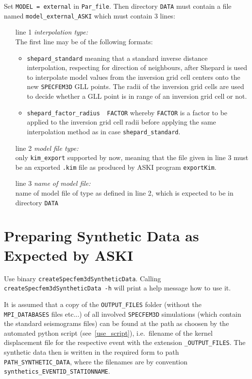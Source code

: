 \documentclass[12pt,a4paper]{article}
\newcommand{\lcode}[1]{\nolinkurl{#1}}
\newcommand{\ASKI}{ {\ttfamily ASKI} }
\begin{document}
Set \lcode{MODEL = external} in \lcode{Par_file}. Then directory \lcode{DATA} must contain a file
named \lcode{model_external_ASKI} which must contain 3 lines:
\begin{itemize}
\item[line 1] \emph{interpolation type:}\\
  The first line may be of the following formats:
  \begin{itemize}
  \item \lcode{shepard_standard}
    meaning that a standard inverse distance interpolation, respecting for direction of neighbours, after Shepard
    is used to interpolate model values from the inversion grid cell centers onto the new \lcode{SPECFEM3D} GLL points.
    The radii of the inversion grid cells are used to decide whether a GLL point is in range of an inversion grid cell
    or not.
  \item \lcode{shepard_factor_radius  FACTOR}
    whereby \lcode{FACTOR} is a factor to be applied to the inversion grid cell radii before applying the same
    interpolation method as in case \lcode{shepard_standard}.
  \end{itemize}
\item[line 2] \emph{model file type:}\\
  only \lcode{kim_export} supported by now, meaning that the file given in line 3 must be an exported \lcode{.kim} file
  as produced by \ASKI program \lcode{exportKim}.
\item[line 3] \emph{name of model file:}\\
  name of model file of type as defined in line 2, which is expected to be in directory \lcode{DATA}
\end{itemize}
%
\section{Preparing Synthetic Data as Expected by \ASKI}
%
Use binary \lcode{createSpecfem3dSyntheticData}. Calling \lcode{createSpecfem3dSyntheticData -h} will print a
help message how to use it.

It is assumed that a copy of the \lcode{OUTPUT_FILES} folder (without the \lcode{MPI_DATABASES} files etc...)
of all involved \lcode{SPECFEM3D} simulations (which contain the standard seismograms files) can be found at 
the path as choosen by the automated python script (see~\ref{use_script}), i.e.\ filename of the kernel displacement 
file for the respective event with the extension \lcode{_OUTPUT_FILES}. 
The synthetic data then is written in the required form to path \lcode{PATH_SYNTHETIC_DATA}, where the filenames are by
convention \lcode{synthetics_EVENTID_STATIONNAME}.  
\end{document}

